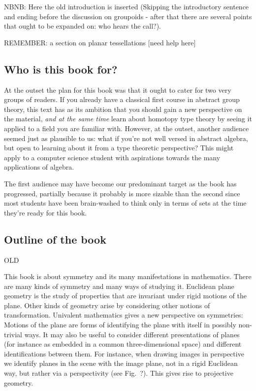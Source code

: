 NBNB: Here the old introduction is inserted (Skipping the introductory sentence and ending before the discussion on groupoids - after that there are several points that ought to be expanded on: who hears the call?).

REMEMBER: a section on planar tessellations [need help here]


\subsection{Who is this book for?}
\label{sec:who}
At the outset the plan for this book was that it ought to cater for two very groups of readers. If you already have a classical first course in abstract group theory, this text has as its ambition that you should gain a new perspective on the material, \emph{and at the same time} learn about homotopy type theory by seeing it applied to a field you are familiar with. However, at the outset, another audience seemed just as plausible to us: what if you're not well versed in abstract algebra, but open to learning about it from a type theoretic perspective? This might apply to a computer science student with aspirations towards the many applications of algebra.

The first audience may have become our predominant target as the book has progressed, partially because it probably is more sizable than the second since most students have been brain-washed to think only in terms of sets at the time they're ready for this book.

\subsection{Outline of the book}
\label{sec:outline}

%






OLD

This book is about symmetry and its many manifestations in mathematics.
There are many kinds of symmetry and many ways of studying it.
Euclidean plane geometry is the study of properties that are invariant under rigid motions of the plane.
Other kinds of geometry arise by considering other notions of transformation.
Univalent mathematics gives a new perspective on symmetries:
Motions of the plane are forms of identifying the plane with itself in possibly non-trivial ways.
It may also be useful to consider different presentations of planes
(for instance as embedded in a common three-dimensional space)
and different identifications between them.
For instance, when drawing images in perspective
we identify planes in the scene with the image plane,
not in a rigid Euclidean way, but
rather via a perspectivity (see Fig.~?).
This gives rise to projective geometry.

